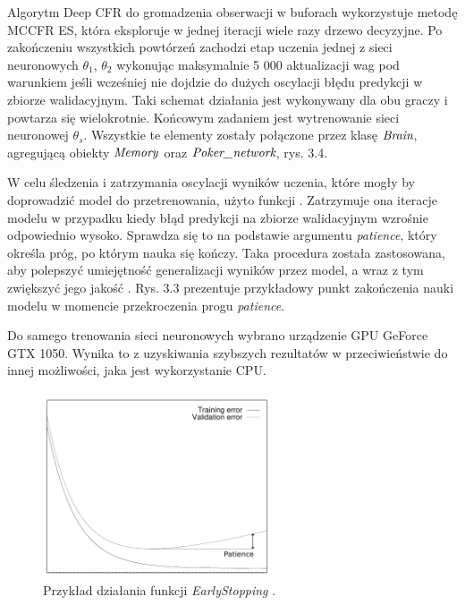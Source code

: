 \documentclass[12pt,oneside,a4paper]{report}
\begin{document}
Algorytm Deep CFR do gromadzenia obserwacji w buforach wykorzystuje metodę MCCFR ES, która eksploruje w jednej iteracji
wiele razy drzewo decyzyjne.
Po zakończeniu 
wszystkich powtórzeń zachodzi etap uczenia jednej z sieci neuronowych $\theta_{1}$, $\theta_{2}$
wykonując maksymalnie 5 000 aktualizacji wag pod warunkiem jeśli wcześniej nie dojdzie do dużych
oscylacji błędu predykcji w zbiorze walidacyjnym.
Taki schemat działania jest wykonywany dla obu graczy i powtarza się wielokrotnie. Końcowym
zadaniem jest wytrenowanie sieci neuronowej $\theta_{s}$.  
Wszystkie te elementy zostały połączone przez klasę $\emph{Brain}$, agregującą obiekty
$\emph{Memory}$
oraz $\emph{Poker\_network}$, rys. 3.4. 

W celu śledzenia i zatrzymania oscylacji wyników uczenia, które mogły by doprowadzić model
do przetrenowania,
użyto funkcji  \cite{tensorflow}.
Zatrzymuje ona iteracje modelu w przypadku kiedy błąd predykcji na zbiorze
walidacyjnym wzrośnie odpowiednio wysoko. Sprawdza się to na podstawie argumentu \emph{patience},
który określa próg, po którym nauka się kończy. Taka procedura została zastosowana, aby
polepszyć umiejętność generalizacji wyników przez model, a wraz z tym zwiększyć jego jakość \cite{early}.
Rys. 3.3 prezentuje przykładowy punkt zakończenia nauki modelu w momencie przekroczenia progu
\emph{patience}.

Do samego trenowania sieci neuronowych wybrano urządzenie GPU GeForce GTX 1050. Wynika to z
uzyskiwania szybszych
rezultatów w przeciwieństwie do innej możliwości, jaka jest wykorzystanie CPU.

\begin{figure}[!ht]
  \centering
  \includegraphics[width=0.6\textwidth]{./img/early.pdf}
  \caption{Przykład działania funkcji \emph{EarlyStopping} \cite{early}.}
\end{figure}

\vspace{2cm}
\end{document}
